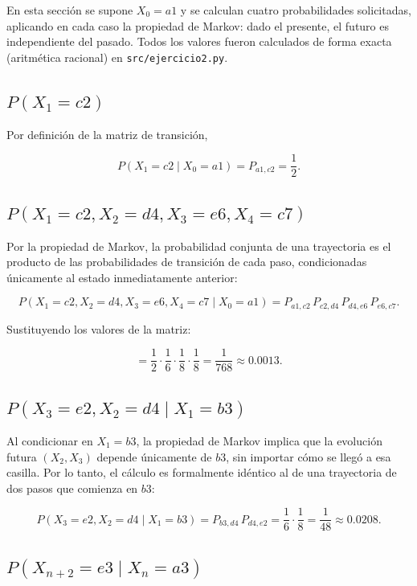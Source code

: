\documentclass[12pt,a4paper]{article}
\begin{document}
En esta sección se supone \(X_0=a1\) y se calculan cuatro
probabilidades solicitadas, aplicando en cada caso la propiedad de
Markov: dado el presente, el futuro es independiente del pasado. Todos
los valores fueron calculados de forma exacta (aritmética racional) en
\texttt{src/ejercicio2.py}.

\subsection{\texorpdfstring{\(P(X_1=c2)\)}{P(X1=c2)}}

Por definición de la matriz de transición,

\[
P(X_1=c2\mid X_0=a1)=P_{a1,c2}=\frac12.
\]

\subsection{\texorpdfstring{\(P(X_1=c2,X_2=d4,X_3=e6,X_4=c7)\)}{Probabilidad de la trayectoria}}

Por la propiedad de Markov, la probabilidad conjunta de una
trayectoria es el producto de las probabilidades de transición de cada
paso, condicionadas únicamente al estado inmediatamente anterior:

\[
P(X_1=c2,X_2=d4,X_3=e6,X_4=c7\mid X_0=a1)
=P_{a1,c2}\,P_{c2,d4}\,P_{d4,e6}\,P_{e6,c7}.
\]

Sustituyendo los valores de la matriz:

\[
=\frac12\cdot\frac16\cdot\frac18\cdot\frac18
=\frac{1}{768}
\approx0.0013.
\]

\subsection{\texorpdfstring{\(P(X_3=e2,X_2=d4\mid X_1=b3)\)}{Probabilidad condicional}}

Al condicionar en \(X_1=b3\), la propiedad de Markov implica que la
evolución futura \((X_2,X_3)\) depende únicamente de \(b3\), sin
importar cómo se llegó a esa casilla. Por lo tanto, el cálculo es
formalmente idéntico al de una trayectoria de dos pasos que comienza
en \(b3\):

\[
P(X_3=e2,X_2=d4\mid X_1=b3)
=P_{b3,d4}\,P_{d4,e2}
=\frac16\cdot\frac18
=\frac{1}{48}
\approx0.0208.
\]

\subsection{\texorpdfstring{\(P(X_{n+2}=e3\mid X_n=a3)\)}{Probabilidad en dos pasos}}
\end{document}
